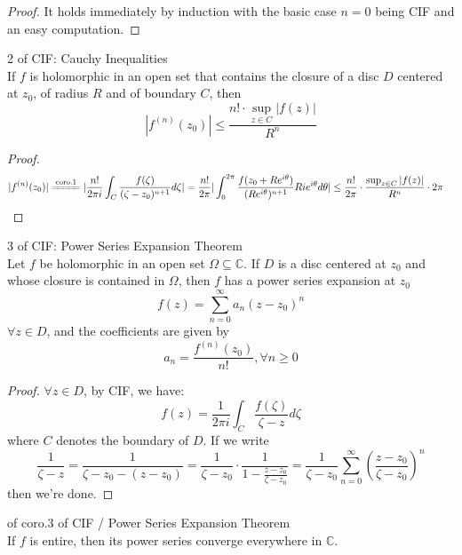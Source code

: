 \begin{proof}
    It holds immediately by induction with the basic case $n=0$ being CIF and an easy computation.
\end{proof}

\begin{corollary}{2 of CIF: Cauchy Inequalities}\\
If $f$ is holomorphic in an open set that contains the closure of a disc $D$ centered at $z_0$, of radius $R$ and of boundary $C$, then
\[
|f^{(n)} (z_0)| \leq \frac{n! \cdot \sup_{z\in C} |f(z)|}{R^n}
\]
\end{corollary}

\begin{proof}
    \begin{align*}
        |f^{(n)} (z_0)|& \xlongequal{\text{coro.1}} |\frac{n!}{2\pi i} \int_C\frac{f(\zeta)}{(\zeta- z_0 )^{n+1}} d\zeta|= \frac{n!}{2\pi} |\int_0^{2\pi} \frac{f(z_0+ Re^{i\theta})}{(Re^{i\theta})^{n+1}} Rie^{i\theta} d\theta| \leq \frac{n!}{2\pi} \cdot \frac{\sup_{z\in C}|f(z)|}{R^n} \cdot 2\pi
    \end{align*}
\end{proof}

\begin{corollary}{3 of CIF: Power Series Expansion Theorem}\\
Let $f$ be holomorphic in an open set $\Omega \subseteq \mathbb{C}$. If $D$ is a disc centered at $z_0$ and whose closure is contained in $\Omega$, then $f$ has a power series expansion at $z_0$
\[
f(z)= \sum_{n=0}^\infty a_n(z-z_0)^n
\]
$\forall z\in D$, and the coefficients are given by
\[
a_n=\frac{f^{(n)}(z_0)}{n!} ,\forall n\geq 0
\]
\end{corollary}

\begin{proof}
    $\forall z\in D$, by CIF, we have:
    \[
    f(z)= \frac{1}{2\pi i} \int_C \frac{f(\zeta)}{\zeta -z} d\zeta
    \]
    where $C$ denotes the boundary of $D$. If we write
    \[
    \frac{1}{\zeta -z}= \frac{1}{\zeta-z_0- (z-z_0)}= \frac{1}{\zeta-z_0} \cdot \frac{1}{1 -\frac{z-z_0}{\zeta-z_0}}= \frac{1}{\zeta-z_0} \sum_{n=0}^\infty (\frac{z-z_0}{\zeta-z_0})^n
    \]
    then we're done.
\end{proof}

\begin{corollary}{of coro.3 of CIF / Power Series Expansion Theorem}\\
If $f$ is entire, then its power series converge everywhere in $\mathbb{C}$.
\end{corollary}

